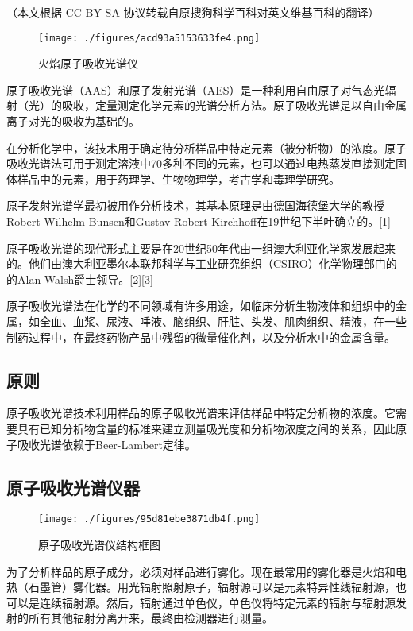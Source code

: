 
（本文根据 CC-BY-SA 协议转载自原搜狗科学百科对英文维基百科的翻译）


\begin{figure}[ht]
\centering
\texttt{[image: ./figures/acd93a5153633fe4.png]}
\caption{火焰原子吸收光谱仪} \label{fig_AAS_1}
\end{figure}

原子吸收光谱（AAS）和原子发射光谱（AES）是一种利用自由原子对气态光辐射（光）的吸收，定量测定化学元素的光谱分析方法。原子吸收光谱是以自由金属离子对光的吸收为基础的。

在分析化学中，该技术用于确定待分析样品中特定元素（被分析物）的浓度。原子吸收光谱法可用于测定溶液中70多种不同的元素，也可以通过电热蒸发直接测定固体样品中的元素，用于药理学、生物物理学，考古学和毒理学研究。

原子发射光谱学最初被用作分析技术，其基本原理是由德国海德堡大学的教授Robert Wilhelm Bunsen和Gustav Robert Kirchhoff在19世纪下半叶确立的。[1]

原子吸收光谱的现代形式主要是在20世纪50年代由一组澳大利亚化学家发展起来的。他们由澳大利亚墨尔本联邦科学与工业研究组织（CSIRO）化学物理部门的的Alan Walsh爵士领导。[2][3]

原子吸收光谱法在化学的不同领域有许多用途，如临床分析生物液体和组织中的金属，如全血、血浆、尿液、唾液、脑组织、肝脏、头发、肌肉组织、精液，在一些制药过程中，在最终药物产品中残留的微量催化剂，以及分析水中的金属含量。

\subsection{原则}

原子吸收光谱技术利用样品的原子吸收光谱来评估样品中特定分析物的浓度。它需要具有已知分析物含量的标准来建立测量吸光度和分析物浓度之间的关系，因此原子吸收光谱依赖于Beer-Lambert定律。

\subsection{原子吸收光谱仪器}

\begin{figure}[ht]
\centering
\texttt{[image: ./figures/95d81ebe3871db4f.png]}
\caption{原子吸收光谱仪结构框图} \label{fig_AAS_2}
\end{figure}

为了分析样品的原子成分，必须对样品进行雾化。现在最常用的雾化器是火焰和电热（石墨管）雾化器。用光辐射照射原子，辐射源可以是元素特异性线辐射源，也可以是连续辐射源。然后，辐射通过单色仪，单色仪将特定元素的辐射与辐射源发射的所有其他辐射分离开来，最终由检测器进行测量。

